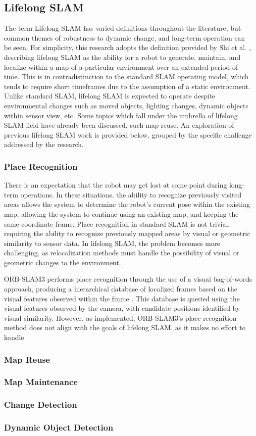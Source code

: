 \subsection{Lifelong SLAM}

The term Lifelong SLAM has varied definitions throughout the literature, but common themes of robustness to dynamic change, and long-term operation can be seen. For simplicity, this research adopts the definition provided by Shi et al. \cite{shiAreWeReady2020}, describing lifelong SLAM as the ability for a robot to generate, maintain, and localize within a map of a particular environment over an extended period of time. This is in contradistinction to the standard SLAM operating model, which tends to require short timeframes due to the assumption of a static environment. Unlike standard SLAM, lifelong SLAM is expected to operate despite environmental changes such as moved objects, lighting changes, dynamic objects within sensor view, etc. Some topics which fall under the umbrella of lifelong SLAM field have already been discussed, such map reuse. An exploration of previous lifelong SLAM work is provided below, grouped by the specific challenge addressed by the research.

\subsubsection{Place Recognition}

There is an expectation that the robot may get lost at some point during long-term operations. In these situations, the ability to recognize previously visited areas allows the system to determine the robot's current pose within the existing map, allowing the system to continue using an existing map, and keeping the same coordinate frame. Place recognition in standard SLAM is not trivial, requiring the ability to recognize previously mapped areas by visual or geometric similarity to sensor data. In lifelong SLAM, the problem becomes more challenging, as relocalization methods must handle the possibility of visual or geometric changes to the environment.

ORB-SLAM3 performs place recognition through the use of a visual bag-of-words approach, producing a hierarchical database of localized frames based on the visual features observed within the frame \cite{camposORBSLAM3AccurateOpenSource2021}\cite{galvez-lopezBagsBinaryWords2012}. This database is queried using the visual features observed by the camera, with candidate positions identified by visual similarity. However, as implemented, ORB-SLAM3's place recognition method does not align with the goals of lifelong SLAM, as it makes no effort to handle 

\subsubsection{Map Reuse}
\subsubsection{Map Maintenance}
\subsubsection{Change Detection}
\subsubsection{Dynamic Object Detection}
